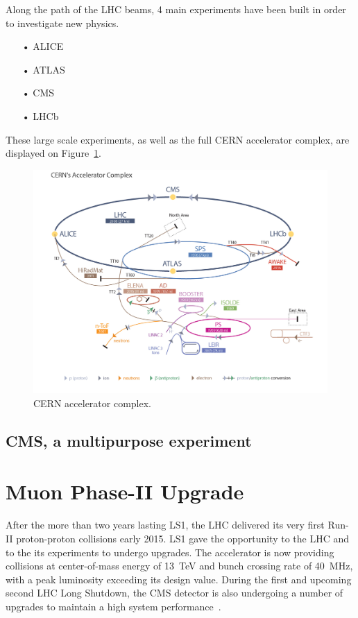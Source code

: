 	Along the path of the LHC beams, 4 main experiments have been built in order to investigate new physics.
	
	\begin{itemize}
		\item[•] ALICE
		\item[•] ATLAS
		\item[•] CMS
		\item[•] LHCb
	\end{itemize}
	
	These large scale experiments, as well as the full CERN accelerator complex, are displayed on Figure~\ref{fig:CERNComplex}.

	\begin{figure}[H]
		\centering
		\includegraphics[width=\linewidth]{fig/chapt2/CERN_Accelerator_Complex.png}
		\caption{\label{fig:CERNComplex} CERN accelerator complex.}
	\end{figure}

	\subsection{CMS, a multipurpose experiment}
	\label{chapt2:ssec:CMS}

\section{Muon Phase-II Upgrade}
\label{chapt2:sec:phase-2}

After the more than two years lasting \acf{LS1}, the \acf{LHC} delivered its very first Run-II proton-proton collisions early 2015. LS1 gave the opportunity to the LHC and to the its experiments to undergo upgrades. The accelerator is now providing collisions at center-of-mass energy of \SI{13}{TeV} and bunch crossing rate of \SI{40}{MHz}, with a peak luminosity exceeding its design value. During the first and upcoming second LHC Long Shutdown, the \acf{CMS} detector is also undergoing a number of upgrades to maintain a high system performance~\cite{MUONTDR}.

